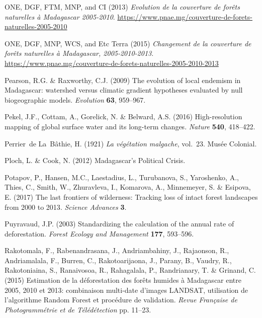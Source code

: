 \documentclass[a4paper, 12pt, leqno]{article}\usepackage[]{graphicx}\usepackage[]{color}
\begin{document}
\begin{thebibliography}{60}
{ONE, DGF, FTM, MNP, and CI} (2013) \emph{{Evolution de la couverture de
  forêts naturelles à Madagascar 2005-2010}}. \url{https://www.pnae.mg/couverture-de-forets-naturelles-2005-2010}

{ONE, DGF, MNP, WCS, and Etc Terra} (2015) \emph{{Changement de la couverture
  de forêts naturelles à Madagascar, 2005-2010-2013}}. \url{https://www.pnae.mg/couverture-de-forets-naturelles-2005-2010-2013}

Pearson, R.G. \& Raxworthy, C.J. (2009) {The evolution of local endemism in
  Madagascar: watershed versus climatic gradient hypotheses evaluated by null
  biogeographic models}. \emph{Evolution} \textbf{63}, 959--967.

Pekel, J.F., Cottam, A., Gorelick, N. \& Belward, A.S. (2016) {High-resolution
  mapping of global surface water and its long-term changes}. \emph{Nature}
  \textbf{540}, 418--422.

Perrier~de La~B{\^a}thie, H. (1921) \emph{{La v{\'e}g{\'e}tation malgache}},
  vol.~23. Mus{\'e}e Colonial.

Ploch, L. \& Cook, N. (2012) {Madagascar's Political Crisis}.

Potapov, P., Hansen, M.C., Laestadius, L., Turubanova, S., Yaroshenko, A.,
  Thies, C., Smith, W., Zhuravleva, I., Komarova, A., Minnemeyer, S. \&
  Esipova, E. (2017) {The last frontiers of wilderness: Tracking loss of intact
  forest landscapes from 2000 to 2013}. \emph{Science Advances} \textbf{3}.

Puyravaud, J.P. (2003) Standardizing the calculation of the annual rate of
  deforestation. \emph{Forest Ecology and Management} \textbf{177}, 593--596.

Rakotomala, F., Rabenandrasana, J., Andriambahiny, J., Rajaonson, R.,
  Andriamalala, F., Burren, C., Rakotoarijaona, J., Parany, B., Vaudry, R.,
  Rakotoniaina, S., Ranaivosoa, R., Rahagalala, P., Randrianary, T. \& Grinand,
  C. (2015) {Estimation de la d{\'e}forestation des for{\^e}ts humides {\`a}
  Madagascar entre 2005, 2010 et 2013: combinaison multi-date d'images LANDSAT,
  utilisation de l'algorithme Random Forest et proc{\'e}dure de validation}.
  \emph{Revue Fran{\c{c}}aise de Photogramm{\'e}trie et de
  T{\'e}l{\'e}d{\'e}tection} pp. 11--23.


\end{thebibliography}
\end{document}
